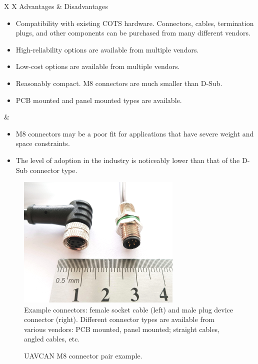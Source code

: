 {
\NoLeftSkip
\begin{UAVCANCompactTable}{X X}
    Advantages & Disadvantages \\
    \begin{itemize}
        \item Compatibility with existing COTS hardware.
        Connectors, cables, termination plugs, and other components can be purchased from many different vendors.
        \item High-reliability options are available from multiple vendors.
        \item Low-cost options are available from multiple vendors.
        \item Reasonably compact. M8 connectors are much smaller than D-Sub.
        \item PCB mounted and panel mounted types are available.
    \end{itemize}
    &
    \begin{itemize}
        \item M8 connectors may be a poor fit for applications that have severe weight and space constraints.
        \item The level of adoption in the industry is noticeably lower than that of the D-Sub connector type.
    \end{itemize}
\end{UAVCANCompactTable}
}

\begin{figure}[hbt]
    \centering
    \includegraphics[width=0.7\textwidth]{transport_layer/m8_connector_pair_female_socket_male_plug}\\
    Example connectors: female socket cable (left) and male plug device connector (right).
    Different connector types are available from various vendors: PCB mounted, panel mounted;
    straight cables, angled cables, etc.
    \caption{UAVCAN M8 connector pair example.
    \label{fig:can_uavcan_m8_connector_example}}
\end{figure}


